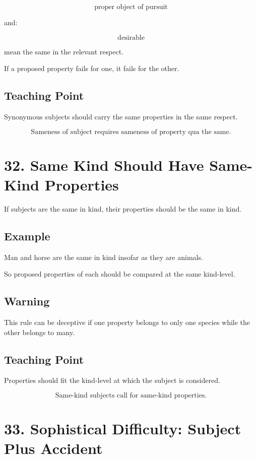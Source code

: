 \documentclass[12pt]{article}
\begin{document}
\[
\text{proper object of pursuit}
\]

and:

\[
\text{desirable}
\]

mean the same in the relevant respect.

If a proposed property fails for one, it fails for the other.

\subsection*{Teaching Point}

Synonymous subjects should carry the same properties in the same respect.

\[
\boxed{
\text{Sameness of subject requires sameness of property qua the same.}
}
\]

\section*{32. Same Kind Should Have Same-Kind Properties}

If subjects are the same in kind, their properties should be the same in kind.

\subsection*{Example}

Man and horse are the same in kind insofar as they are animals.

So proposed properties of each should be compared at the same kind-level.

\subsection*{Warning}

This rule can be deceptive if one property belongs to only one species while the
other belongs to many.

\subsection*{Teaching Point}

Properties should fit the kind-level at which the subject is considered.

\[
\boxed{
\text{Same-kind subjects call for same-kind properties.}
}
\]

\section*{33. Sophistical Difficulty: Subject Plus Accident}
\end{document}
